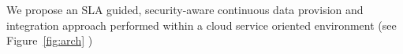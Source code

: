 We propose an SLA guided, security-aware continuous data provision and integration approach performed within a cloud service oriented environment  (see
Figure~\ref{fig:arch} )


\begin{figure}
\end{figure}


